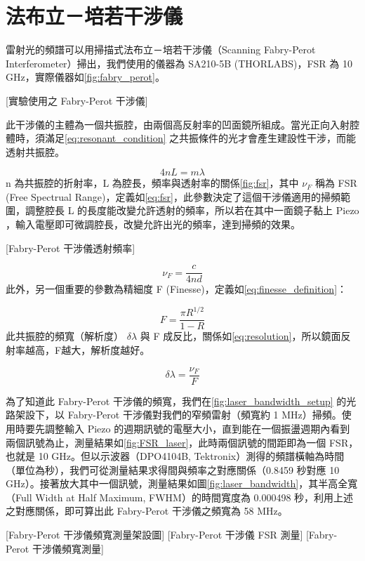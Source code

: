 \documentclass[class=NCU_thesis, crop=false]{standalone}
\begin{document}
\chapter{法布立－培若干涉儀}
雷射光的頻譜可以用掃描式法布立－培若干涉儀（Scanning Fabry-Perot Interferometer）掃出，我們使用的儀器為 SA210-5B (THORLABS)，FSR 為 10 GHz，實際儀器如\cref{fig:fabry_perot}。

[實驗使用之 Fabry-Perot 干涉儀]

此干涉儀的主體為一個共振腔，由兩個高反射率的凹面鏡所組成。當光正向入射腔體時，須滿足\cref{eq:resonant_condition} 之共振條件的光才會產生建設性干涉，而能透射共振腔。

\begin{equation}
    4nL=m\lambda
    \label{eq:resonant_condition}
\end{equation}
n 為共振腔的折射率，L 為腔長，頻率與透射率的關係\cref{fig:fsr}，其中 $\nu_{F}$ 稱為 FSR (Free Spectrual Range)，定義如\cref{eq:fsr}，此參數決定了這個干涉儀適用的掃頻範圍，調整腔長 L 的長度能改變允許透射的頻率，所以若在其中一面鏡子黏上 Piezo ，輸入電壓即可微調腔長，改變允許出光的頻率，達到掃頻的效果。

[Fabry-Perot 干涉儀透射頻率]

\begin{equation}
    \nu_{F}=\frac{c}{4nd}
    \label{eq:fsr}
\end{equation}
此外，另一個重要的參數為精細度 F (Finesse)，定義如\cref{eq:finesse_definition}：

\begin{equation}
    F=\frac{\pi R^{1/2}}{1-R}
    \label{eq:finesse_definition}
\end{equation}
此共振腔的頻寬（解析度） $\delta \lambda$ 與 F 成反比，關係如\cref{eq:resolution}，所以鏡面反射率越高，F越大，解析度越好。

\begin{equation}
    \delta \lambda=\frac{\nu_{F}}{F}
    \label{eq:resolution}
\end{equation}

為了知道此 Fabry-Perot 干涉儀的頻寬，我們在\cref{fig:laser_bandwidth_setup} 的光路架設下，以 Fabry-Perot 干涉儀對我們的窄頻雷射（頻寬約 1 MHz）掃頻。使用時要先調整輸入 Piezo 的週期訊號的電壓大小，直到能在一個振盪週期內看到兩個訊號為止，測量結果如\cref{fig:FSR_laser}，此時兩個訊號的間距即為一個 FSR，也就是 10 GHz。但以示波器（DPO4104B, Tektronix）測得的頻譜橫軸為時間（單位為秒），我們可從測量結果求得間與頻率之對應關係（0.8459 秒對應 10 GHz）。接著放大其中一個訊號，測量結果如圖\cref{fig:laser_bandwidth}，其半高全寬（Full Width at Half Maximum, FWHM）的時間寬度為 0.000498 秒，利用上述之對應關係，即可算出此 Fabry-Perot 干涉儀之頻寬為 58 MHz。

[Fabry-Perot 干涉儀頻寬測量架設圖]
[Fabry-Perot 干涉儀 FSR 測量]
[Fabry-Perot 干涉儀頻寬測量]
\end{document}
